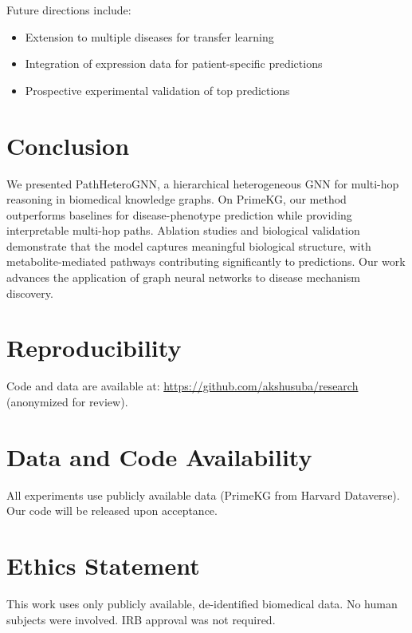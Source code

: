 \documentclass[twoside]{article}
\begin{document}
Future directions include:
\begin{itemize}
    \item Extension to multiple diseases for transfer learning
    \item Integration of expression data for patient-specific predictions
    \item Prospective experimental validation of top predictions
\end{itemize}

\section{Conclusion}

We presented PathHeteroGNN, a hierarchical heterogeneous GNN for multi-hop reasoning in biomedical knowledge graphs. On PrimeKG, our method outperforms baselines for disease-phenotype prediction while providing interpretable multi-hop paths. Ablation studies and biological validation demonstrate that the model captures meaningful biological structure, with metabolite-mediated pathways contributing significantly to predictions. Our work advances the application of graph neural networks to disease mechanism discovery.

\section*{Reproducibility}

Code and data are available at: \url{https://github.com/akshusuba/research} (anonymized for review).

\section*{Data and Code Availability}

All experiments use publicly available data (PrimeKG from Harvard Dataverse). Our code will be released upon acceptance.

\section*{Ethics Statement}

This work uses only publicly available, de-identified biomedical data. No human subjects were involved. IRB approval was not required.
\end{document}
